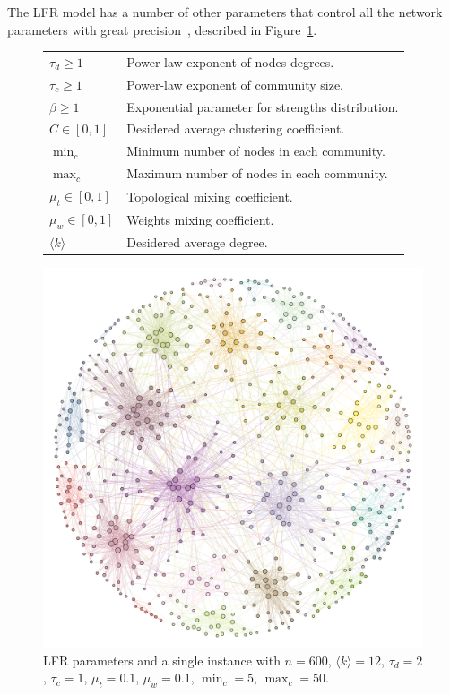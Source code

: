 The LFR model has a number of other parameters that control all the network parameters with great precision~\cite{lancichinetti2008,lancichinetti2009a}, described in Figure~\ref{tab:lfrparams}.
\begin{figure}[htb!]\centering
\begin{footnotesize}
\noindent\begin{minipage}[b!]{0.48\textwidth}
\begin{tabular}{l|p{}}
\hline
$\tau_d \geq 1$ & Power-law exponent of nodes degrees.\\
$\tau_c \geq 1$ & Power-law exponent of community size.\\
$\beta \geq 1$  &Exponential parameter for strengths distribution.\\
$C \in [0,1]$ & Desidered average clustering coefficient.\\
$\min_c$ & Minimum number of nodes in each community.\\
$\max_c$  & Maximum number of nodes in each community.\\
$\mu_t \in [0,1]$ & Topological mixing coefficient.\\
$\mu_w \in [0,1]$ & Weights mixing coefficient.\\
$\langle k\rangle $ &Desidered average degree.\\
\hline
\end{tabular}
\end{minipage}\hfill
\begin{minipage}[b!]{0.35\textwidth}\flushright
\includegraphics[width=1\textwidth]{images/LFRexample.pdf}
\end{minipage}
\end{footnotesize}
\caption{LFR parameters and a single instance with $n=600$, $\langle k \rangle =12$, $\tau_d=2$, $\tau_c=1$, $\mu_t=0.1$, $\mu_w=0.1$, $\min_c=5$, $\max_c=50$.}
\label{tab:lfrparams}
\end{figure}

